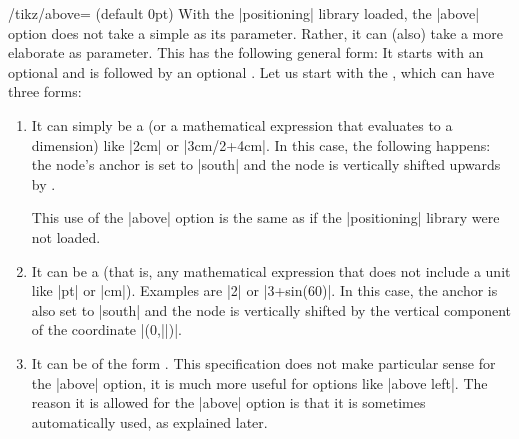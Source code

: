 \begin{key}{/tikz/above= (default 0pt)}
    With the |positioning| library loaded, the |above| option does not take a
    simple  as its parameter. Rather, it can (also) take a more
    elaborate  as parameter. This  has
    the following general form: It starts with an optional 
    and is followed by an optional . Let us start with the
    , which can have three forms:
    \begin{enumerate}
        \item It can simply be a  (or a mathematical
            expression that evaluates to a dimension) like |2cm| or
            |3cm/2+4cm|. In this case, the following happens: the node's anchor
            is set to |south| and the node is vertically shifted upwards by
            .
\begin{codeexample}[]
\end{codeexample}
            This use of the |above| option is the same as if the |positioning|
            library were not loaded.
        \item It can be a  (that is, any mathematical
            expression that does not include a unit like |pt| or |cm|).
            Examples are |2| or |3+sin(60)|. In this case, the anchor is also
            set to |south| and the node is vertically shifted by the vertical
            component of the coordinate |(0,||)|.
\begin{codeexample}[]
\end{codeexample}
        \item It can be of the form
            .
            This specification does not make particular sense for the |above|
            option, it is much more useful for options like |above left|. The
            reason it is allowed for the |above| option is that it is sometimes
            automatically used, as explained later.


\end{enumerate}
\end{key}
